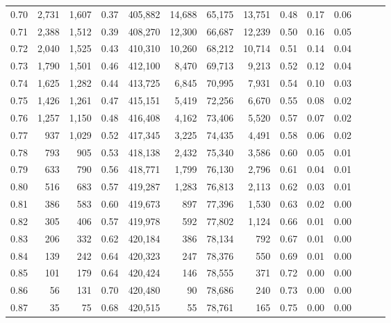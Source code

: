 \begin{tabular}{rrrrrrrrrrrrrr}
0.70 &   2,731 &  1,607 &  0.37 &  405,882 &   14,688 &  65,175 &  13,751 &  0.48 &  0.17 &      0.06 \\
0.71 &   2,388 &  1,512 &  0.39 &  408,270 &   12,300 &  66,687 &  12,239 &  0.50 &  0.16 &      0.05 \\
0.72 &   2,040 &  1,525 &  0.43 &  410,310 &   10,260 &  68,212 &  10,714 &  0.51 &  0.14 &      0.04 \\
0.73 &   1,790 &  1,501 &  0.46 &  412,100 &    8,470 &  69,713 &   9,213 &  0.52 &  0.12 &      0.04 \\
0.74 &   1,625 &  1,282 &  0.44 &  413,725 &    6,845 &  70,995 &   7,931 &  0.54 &  0.10 &      0.03 \\
0.75 &   1,426 &  1,261 &  0.47 &  415,151 &    5,419 &  72,256 &   6,670 &  0.55 &  0.08 &      0.02 \\
0.76 &   1,257 &  1,150 &  0.48 &  416,408 &    4,162 &  73,406 &   5,520 &  0.57 &  0.07 &      0.02 \\
0.77 &     937 &  1,029 &  0.52 &  417,345 &    3,225 &  74,435 &   4,491 &  0.58 &  0.06 &      0.02 \\
0.78 &     793 &    905 &  0.53 &  418,138 &    2,432 &  75,340 &   3,586 &  0.60 &  0.05 &      0.01 \\
0.79 &     633 &    790 &  0.56 &  418,771 &    1,799 &  76,130 &   2,796 &  0.61 &  0.04 &      0.01 \\
0.80 &     516 &    683 &  0.57 &  419,287 &    1,283 &  76,813 &   2,113 &  0.62 &  0.03 &      0.01 \\
0.81 &     386 &    583 &  0.60 &  419,673 &      897 &  77,396 &   1,530 &  0.63 &  0.02 &      0.00 \\
0.82 &     305 &    406 &  0.57 &  419,978 &      592 &  77,802 &   1,124 &  0.66 &  0.01 &      0.00 \\
0.83 &     206 &    332 &  0.62 &  420,184 &      386 &  78,134 &     792 &  0.67 &  0.01 &      0.00 \\
0.84 &     139 &    242 &  0.64 &  420,323 &      247 &  78,376 &     550 &  0.69 &  0.01 &      0.00 \\
0.85 &     101 &    179 &  0.64 &  420,424 &      146 &  78,555 &     371 &  0.72 &  0.00 &      0.00 \\
0.86 &      56 &    131 &  0.70 &  420,480 &       90 &  78,686 &     240 &  0.73 &  0.00 &      0.00 \\
0.87 &      35 &     75 &  0.68 &  420,515 &       55 &  78,761 &     165 &  0.75 &  0.00 &      0.00 \\

\end{tabular}
